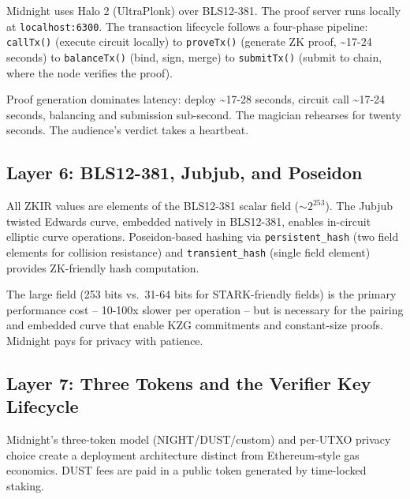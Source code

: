 \documentclass[
  11pt,
  openany]{report}
\begin{document}
Midnight uses Halo 2 (UltraPlonk) over BLS12-381. The proof server runs locally
at \texttt{localhost:6300}. The transaction lifecycle follows a four-phase
pipeline: \texttt{callTx()} (execute circuit locally) to \texttt{proveTx()}
(generate ZK proof, \textasciitilde17-24 seconds) to \texttt{balanceTx()} (bind,
sign, merge) to \texttt{submitTx()} (submit to chain, where the node verifies
the proof).

Proof generation dominates latency: deploy \textasciitilde17-28 seconds, circuit
call \textasciitilde17-24 seconds, balancing and submission sub-second. The
magician rehearses for twenty seconds. The audience's verdict takes a heartbeat.

\subsection{Layer 6: BLS12-381, Jubjub, and
Poseidon}\label{layer-6-bls12-381-jubjub-and-poseidon}

All ZKIR values are elements of the BLS12-381 scalar field (\(\sim 2^{253}\)).
The Jubjub twisted Edwards curve, embedded natively in BLS12-381, enables
in-circuit elliptic curve operations. Poseidon-based hashing via
\texttt{persistent\_hash} (two field elements for collision resistance) and
\texttt{transient\_hash} (single field element) provides ZK-friendly hash
computation.

The large field (253 bits vs.~31-64 bits for STARK-friendly fields) is the
primary performance cost -- 10-100x slower per operation -- but is necessary for
the pairing and embedded curve that enable KZG commitments and constant-size
proofs. Midnight pays for privacy with patience.

\subsection{Layer 7: Three Tokens and the Verifier Key
Lifecycle}\label{layer-7-three-tokens-and-the-verifier-key-lifecycle}

Midnight's three-token model (NIGHT/DUST/custom) and per-UTXO privacy choice
create a deployment architecture distinct from Ethereum-style gas economics.
DUST fees are paid in a public token generated by time-locked staking.
\end{document}
